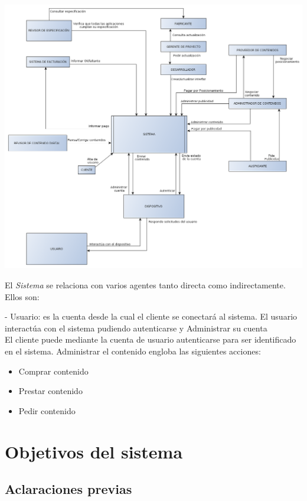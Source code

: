 \documentclass[11pt, a4paper, spanish]{article}
\begin{document}
	\begin{center}
		\includegraphics[scale=0.35]{Diagramas/DiagramaContexto.png}
	\end{center}

	El \emph{Sistema} se relaciona con varios agentes tanto directa como indirectamente. Ellos son:

	- Usuario: es la cuenta desde la cual el cliente se conectar\'a al sistema.
	El usuario interact\'ua con el sistema pudiendo autenticarse y Administrar su cuenta\\

		El cliente puede mediante la cuenta de usuario autenticarse para ser identificado en el sistema.
		Administrar el contenido engloba las siguientes acciones:

		\begin{itemize}
		\item{Comprar contenido}
		\item{Prestar contenido}
		\item{Pedir contenido}
		\end{itemize}

	
\section{Objetivos del sistema}

\subsection{Aclaraciones previas}
\end{document}
